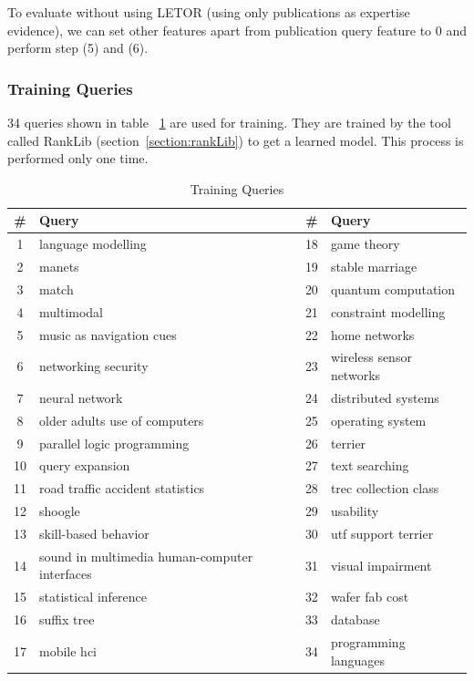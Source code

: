 To evaluate without using LETOR (using only publications as expertise evidence), we can set other features apart from publication query feature to 0
and perform step (5) and (6).

\subsubsection{Training Queries}
34 queries shown in table ~\ref{table:trainingqueries} are used for training. They are trained by the tool called RankLib (section~\ref{section:rankLib}) to get a learned model. 
This process is performed only one time.
\begin{table}
\centering
\begin{tabular}{|c|l|c|l|}
\hline \textbf{\#} & \textbf{Query} & \textbf{\#} & \textbf{Query} \\
\hline 1 & language modelling & 18 & game theory\\
\hline 2 & manets & 19 & stable marriage \\
\hline 3  & match & 20 & quantum computation\\ 
\hline 4  & multimodal & 21 & constraint modelling\\ 
\hline 5  & music as navigation cues & 22 & home networks\\ 
\hline 6  & networking security & 23 & wireless sensor networks\\ 
\hline 7  & neural network & 24 & distributed systems\\ 
\hline 8  & older adults use of computers & 25 & operating system\\ 
\hline 9  & parallel logic programming & 26 & terrier\\ 
\hline 10  & query expansion & 27 & text searching\\ 
\hline 11  & road traffic accident statistics & 28 & trec collection class\\ 
\hline 12  & shoogle & 29 & usability\\ 
\hline 13  & skill-based behavior & 30 & utf support terrier\\ 
\hline 14  & sound in multimedia human-computer interfaces & 31 & visual impairment\\ 
\hline 15  & statistical inference & 32 & wafer fab cost \\ 
\hline 16  & suffix tree & 33 & database\\ 
\hline 17  & mobile hci & 34 & programming languages\\ 
\hline
\end{tabular}
\caption{Training Queries} \label{table:trainingqueries}
\end{table}

